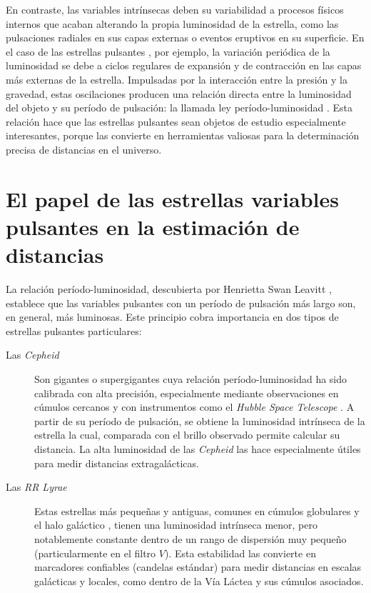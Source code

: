 En contraste, las variables intrínsecas deben su variabilidad a procesos físicos internos que acaban alterando la propia luminosidad de la estrella, como las pulsaciones radiales en sus capas externas o eventos eruptivos en su superficie. En el caso de las estrellas pulsantes \citep{cox1974pulsatingvariables}, por ejemplo, la variación periódica de la luminosidad se debe a ciclos regulares de expansión y de contracción en las capas más externas de la estrella. Impulsadas por la interacción entre la presión y la gravedad, estas oscilaciones producen una relación directa entre la luminosidad del objeto y su período de pulsación: la llamada ley período-luminosidad \citep{leavitt1912periods}. Esta relación hace que las estrellas pulsantes sean objetos de estudio especialmente interesantes, porque las convierte en herramientas valiosas para la determinación precisa de distancias en el universo.

\section{El papel de las estrellas variables pulsantes en la estimación de distancias}

La relación período-luminosidad, descubierta por Henrietta Swan Leavitt \citep{leavitt1907variables, leavitt1912periods}, establece que las variables pulsantes con un período de pulsación más largo son, en general, más luminosas. Este principio cobra importancia en dos tipos de estrellas pulsantes particulares:

\begin{description}
    \item[Las \emph{Cepheid}]
    Son gigantes o supergigantes cuya relación período-luminosidad ha sido calibrada con alta precisión, especialmente mediante observaciones en cúmulos cercanos y con instrumentos como el \emph{Hubble Space Telescope} \citep{altavilla2004cepheids}. A partir de su período de pulsación, se obtiene la luminosidad intrínseca de la estrella la cual, comparada con el brillo observado permite calcular su distancia. La alta luminosidad de las \emph{Cepheid} las hace especialmente útiles para medir distancias extragalácticas.
    
    \item[Las \emph{RR Lyrae}]
    Estas estrellas más pequeñas y antiguas, comunes en cúmulos globulares y el halo galáctico \citep{dallora2006rrlyraedistancescale}, tienen una luminosidad intrínseca menor, pero notablemente constante dentro de un rango de dispersión muy pequeño (particularmente en el filtro $V$). Esta estabilidad las convierte en marcadores confiables (candelas estándar) para medir distancias en escalas galácticas y locales, como dentro de la Vía Láctea y sus cúmulos asociados. 
\end{description}

